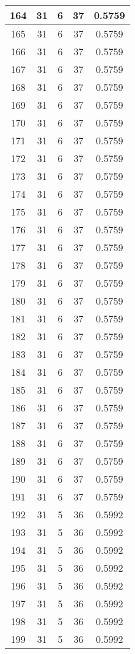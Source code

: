 \documentclass[letterpaper, 12pt]{article}
\begin{document}
\begin{longtable}{|c|c|c|c|c|}
\hline
164 & 31 & 6 & 37 & 0.5759 \\
\hline
165 & 31 & 6 & 37 & 0.5759 \\
\hline
166 & 31 & 6 & 37 & 0.5759 \\
\hline
167 & 31 & 6 & 37 & 0.5759 \\
\hline
168 & 31 & 6 & 37 & 0.5759 \\
\hline
169 & 31 & 6 & 37 & 0.5759 \\
\hline
170 & 31 & 6 & 37 & 0.5759 \\
\hline
171 & 31 & 6 & 37 & 0.5759 \\
\hline
172 & 31 & 6 & 37 & 0.5759 \\
\hline
173 & 31 & 6 & 37 & 0.5759 \\
\hline
174 & 31 & 6 & 37 & 0.5759 \\
\hline
175 & 31 & 6 & 37 & 0.5759 \\
\hline
176 & 31 & 6 & 37 & 0.5759 \\
\hline
177 & 31 & 6 & 37 & 0.5759 \\
\hline
178 & 31 & 6 & 37 & 0.5759 \\
\hline
179 & 31 & 6 & 37 & 0.5759 \\
\hline
180 & 31 & 6 & 37 & 0.5759 \\
\hline
181 & 31 & 6 & 37 & 0.5759 \\
\hline
182 & 31 & 6 & 37 & 0.5759 \\
\hline
183 & 31 & 6 & 37 & 0.5759 \\
\hline
184 & 31 & 6 & 37 & 0.5759 \\
\hline
185 & 31 & 6 & 37 & 0.5759 \\
\hline
186 & 31 & 6 & 37 & 0.5759 \\
\hline
187 & 31 & 6 & 37 & 0.5759 \\
\hline
188 & 31 & 6 & 37 & 0.5759 \\
\hline
189 & 31 & 6 & 37 & 0.5759 \\
\hline
190 & 31 & 6 & 37 & 0.5759 \\
\hline
191 & 31 & 6 & 37 & 0.5759 \\
\hline
192 & 31 & 5 & 36 & 0.5992 \\
\hline
193 & 31 & 5 & 36 & 0.5992 \\
\hline
194 & 31 & 5 & 36 & 0.5992 \\
\hline
195 & 31 & 5 & 36 & 0.5992 \\
\hline
196 & 31 & 5 & 36 & 0.5992 \\
\hline
197 & 31 & 5 & 36 & 0.5992 \\
\hline
198 & 31 & 5 & 36 & 0.5992 \\
\hline
199 & 31 & 5 & 36 & 0.5992 \\
\hline
\end{longtable}
\end{document}
